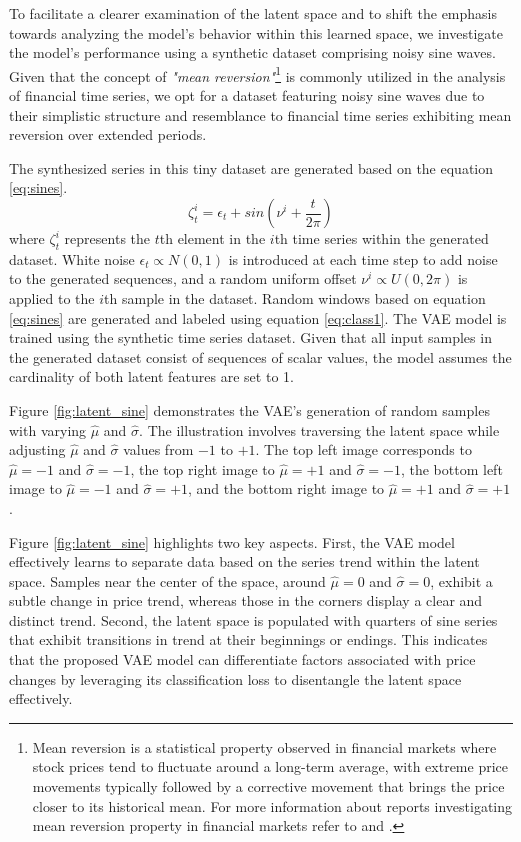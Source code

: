 To facilitate a clearer examination of the latent space and to shift the emphasis towards analyzing the model's behavior within this learned space, we investigate the model's performance using a synthetic dataset comprising noisy sine waves. Given that the concept of \textit{"mean reversion"}\footnote{Mean reversion is a statistical property observed in financial markets where stock prices tend to fluctuate around a long-term average, with extreme price movements typically followed by a corrective movement that brings the price closer to its historical mean. For more information about reports investigating mean reversion property in financial markets refer to \citet{enow2023investigating} and \citet{corbet2020asymmetric}.} is commonly utilized in the analysis of financial time series, we opt for a dataset featuring noisy sine waves due to their simplistic structure and resemblance to financial time series exhibiting mean reversion over extended periods.

The synthesized series in this tiny dataset are generated based on the equation \eqref{eq:sines}.
\begin{equation}
	\zeta_t^i = \epsilon_t + sin(\nu^i + \frac{t}{2\pi})
	\label{eq:sines}
\end{equation}
where $\zeta_t^i$  represents the $t$th element in the $i$th time series within the generated dataset. White noise $\epsilon_t \propto N(0,1)$ is introduced at each time step to add noise to the generated sequences, and a random uniform offset  $\nu^i \propto U(0, 2\pi)$ is applied to the $i$th sample in the dataset. Random windows based on equation \eqref{eq:sines} are generated and labeled using equation \eqref{eq:class1}. The VAE model is trained using the synthetic time series dataset. Given that all input samples in the generated dataset consist of sequences of scalar values, the model assumes the cardinality of both latent features are set to 1.

Figure \ref{fig:latent_sine} demonstrates the VAE's generation of random samples with varying $\hat{\mu}$ and $\hat{\sigma}$. The illustration involves traversing the latent space while adjusting $\hat{\mu}$ and $\hat{\sigma}$ values from $-1$ to $+1$. The top left image corresponds to $\hat{\mu} = -1$ and  $\hat{\sigma} = -1$, the top right image to $\hat{\mu} = +1$ and  $\hat{\sigma} = -1$, the bottom left image to $\hat{\mu} = -1$ and  $\hat{\sigma} = +1$, and the bottom right image to $\hat{\mu} = +1$ and  $\hat{\sigma} = +1$.

Figure \ref{fig:latent_sine} highlights two key aspects. First, the VAE model effectively learns to separate data based on the series trend within the latent space. Samples near the center of the space, around $\hat{\mu} = 0$ and  $\hat{\sigma} = 0$, exhibit a subtle change in price trend, whereas those in the corners display a clear and distinct trend. Second, the latent space is populated with quarters of sine series that exhibit transitions in trend at their beginnings or endings. This indicates that the proposed VAE model can differentiate factors associated with price changes by leveraging its classification loss to disentangle the latent space effectively.

